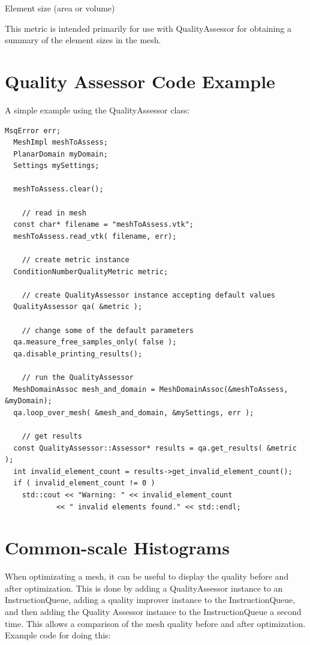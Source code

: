 Element size (area or volume)

This metric is intended primarily for use with QualityAssessor for obtaining a summary of the element sizes in the mesh.



\clearpage
\section{Quality Assessor Code Example}

A simple example using the QualityAssessor class:

\begin{lstlisting}[frame=single]
  MsqError err;
  MeshImpl meshToAssess;
  PlanarDomain myDomain;
  Settings mySettings;

  meshToAssess.clear();

    // read in mesh
  const char* filename = "meshToAssess.vtk";
  meshToAssess.read_vtk( filename, err);

    // create metric instance
  ConditionNumberQualityMetric metric;

    // create QualityAssessor instance accepting default values
  QualityAssessor qa( &metric );

    // change some of the default parameters
  qa.measure_free_samples_only( false );
  qa.disable_printing_results();

    // run the QualityAssessor
  MeshDomainAssoc mesh_and_domain = MeshDomainAssoc(&meshToAssess, &myDomain);
  qa.loop_over_mesh( &mesh_and_domain, &mySettings, err );

    // get results
  const QualityAssessor::Assessor* results = qa.get_results( &metric );
  int invalid_element_count = results->get_invalid_element_count();
  if ( invalid_element_count != 0 )
    std::cout << "Warning: " << invalid_element_count
			<< " invalid elements found." << std::endl;
\end{lstlisting}

\section{Common-scale Histograms}

When optimizating a mesh, it can be useful to display the quality before and after optimization.  This is done by adding a QualityAssessor instance to an InstructionQueue, adding a quality improver instance to the InstructionQueue, and then adding the Quality Assessor instance to the InstructionQueue a second time.  This allows a comparison of the mesh quality before and after optimization.  Example code for doing this:


